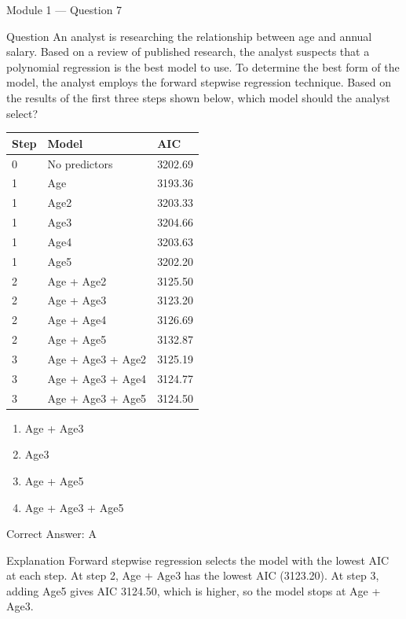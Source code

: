\documentclass[aspectratio=169,10pt]{beamer}
\newcommand{\question}[1]{%
	\begin{block}{Question}
		#1
	\end{block}
}
\newcommand{\options}[4]{%
	\begin{enumerate}[label=\Alph*.,leftmargin=*]
		\item #1
		\item #2
		\item #3
		\item #4
	\end{enumerate}
}
\newcommand{\answerbox}[1]{%
	\begin{exampleblock}{Correct Answer: #1}
	\end{exampleblock}
}
\newcommand{\explain}[1]{%
	\begin{block}{Explanation}
		\small #1
	\end{block}
}
\begin{document}
	\begin{frame}{Module 1 --- Question 7}
		\question{An analyst is researching the relationship between age and annual salary. Based on a review of published research, the analyst suspects that a polynomial regression is the best model to use. To determine the best form of the model, the analyst employs the forward stepwise regression technique. Based on the results of the first three steps shown below, which model should the analyst select?}
		\begin{center}
			\small
			\begin{tabular}{@{}lll@{}}
				\toprule
				Step & Model & AIC \\
				\midrule
				0 & No predictors & 3202.69 \\
				1 & Age & 3193.36 \\
				1 & Age2 & 3203.33 \\
				1 & Age3 & 3204.66 \\
				1 & Age4 & 3203.63 \\
				1 & Age5 & 3202.20 \\
				2 & Age + Age2 & 3125.50 \\
				2 & Age + Age3 & 3123.20 \\
				2 & Age + Age4 & 3126.69 \\
				2 & Age + Age5 & 3132.87 \\
				3 & Age + Age3 + Age2 & 3125.19 \\
				3 & Age + Age3 + Age4 & 3124.77 \\
				3 & Age + Age3 + Age5 & 3124.50 \\
				\bottomrule
			\end{tabular}
		\end{center}
		\options{Age + Age3}{Age3}{Age + Age5}{Age + Age3 + Age5}
		\answerbox{A}
		\explain{Forward stepwise regression selects the model with the lowest AIC at each step. At step 2, Age + Age3 has the lowest AIC (3123.20). At step 3, adding Age5 gives AIC 3124.50, which is higher, so the model stops at Age + Age3.}
	\end{frame}
	
\end{document}
